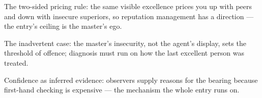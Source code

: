 \begin{unique}
  \item The two-sided pricing rule: the same visible excellence prices you up with peers and down with insecure superiors, so reputation management has a direction --- the entry's ceiling is the master's ego.
  \item The inadvertent case: the master's insecurity, not the agent's display, sets the threshold of offence; diagnosis must run on how the last excellent person was treated.
  \item Confidence as inferred evidence: observers supply reasons for the bearing because first-hand checking is expensive --- the mechanism the whole entry runs on.
\end{unique}
